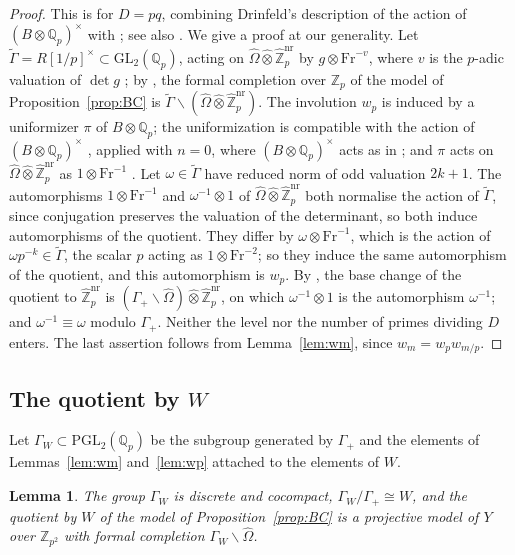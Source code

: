 \documentclass[11pt]{amsart}
\theoremstyle{plain}
\newtheorem{lemma}[theorem]{Lemma}
\theoremstyle{remark}
\newcommand{\Z}{\mathbb{Z}}
\newcommand{\Qp}{\mathbb{Q}_p}
\newcommand{\Zpnr}{\widehat{\mathbb{Z}}_p^{\mathrm{nr}}}
\newcommand{\Ohat}{\widehat{\Omega}}
\newcommand{\Fr}{\mathrm{Fr}}
\newcommand{\PGL}{\mathrm{PGL}}
\newcommand{\GL}{\mathrm{GL}}
\begin{document}
\begin{proof}
This is \cite[\S4, p.~463]{Rib} for $D = pq$, combining Drinfeld's description of the action of $(B \otimes \Qp)^\times$ with \cite[Theorems~4.3$'$ and~4.4]{JL}; see also \cite[p.~202]{Ogg}. We give a proof at our generality. Let $\widetilde{\Gamma} = R[1/p]^\times \subset \GL_2(\Qp)$, acting on $\Ohat \widehat{\otimes} \Zpnr$ by $g \otimes \Fr^{-v}$, where $v$ is the $p$-adic valuation of $\det g$ \cite[II, Theorem~(9.3)]{BC}; by \cite[III, 5.3.3]{BC}, the formal completion over $\Z_p$ of the model of Proposition~\ref{prop:BC} is $\widetilde{\Gamma}\backslash(\Ohat \widehat{\otimes} \Zpnr)$. The involution $w_p$ is induced by a uniformizer $\pi$ of $B \otimes \Qp$; the uniformization is compatible with the action of $(B \otimes \Qp)^\times$ \cite[III, Theorem~(5.5)]{BC}, applied with $n = 0$, where $(B \otimes \Qp)^\times$ acts as in \cite[II, 9.4]{BC}; and $\pi$ acts on $\Ohat \widehat{\otimes} \Zpnr$ as $1 \otimes \Fr^{-1}$ \cite[II, Theorem~(9.5)]{BC}. Let $\omega \in \widetilde{\Gamma}$ have reduced norm of odd valuation $2k + 1$. The automorphisms $1 \otimes \Fr^{-1}$ and $\omega^{-1} \otimes 1$ of $\Ohat \widehat{\otimes} \Zpnr$ both normalise the action of $\widetilde{\Gamma}$, since conjugation preserves the valuation of the determinant, so both induce automorphisms of the quotient. They differ by $\omega \otimes \Fr^{-1}$, which is the action of $\omega p^{-k} \in \widetilde{\Gamma}$, the scalar $p$ acting as $1 \otimes \Fr^{-2}$; so they induce the same automorphism of the quotient, and this automorphism is $w_p$. By \cite[III, 5.3.3]{BC}, the base change of the quotient to $\Zpnr$ is $(\Gamma_+\backslash\Ohat) \widehat{\otimes} \Zpnr$, on which $\omega^{-1} \otimes 1$ is the automorphism $\omega^{-1}$; and $\omega^{-1} \equiv \omega$ modulo $\Gamma_+$. Neither the level nor the number of primes dividing $D$ enters. The last assertion follows from Lemma~\ref{lem:wm}, since $w_m = w_p w_{m/p}$.
\end{proof}

\subsection{The quotient by $W$}

Let $\Gamma_W \subset \PGL_2(\Qp)$ be the subgroup generated by $\Gamma_+$ and the elements of Lemmas~\ref{lem:wm} and~\ref{lem:wp} attached to the elements of $W$.

\begin{lemma}\label{lem:quot}
The group $\Gamma_W$ is discrete and cocompact, $\Gamma_W/\Gamma_+ \cong W$, and the quotient by $W$ of the model of Proposition~\ref{prop:BC} is a projective model of $Y$ over $\Z_{p^2}$ with formal completion $\Gamma_W\backslash\Ohat$.
\end{lemma}
\end{document}

